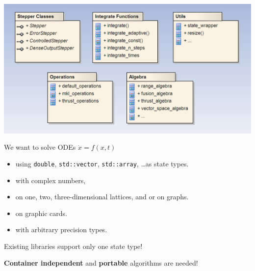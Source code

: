 \begin{frame}
 
 \vspace{2ex}
 \centerline{\includegraphics[draft=false,width=1.0\textwidth]{odeint_components.png}}

\end{frame}




\begin{frame}[fragile]

 \vspace{2ex}

 We want to solve ODEs $\dot{x}=f(x,t)$
 \begin{itemize}
  \item using  {\tt double}, {\tt std::vector}, {\tt std::array}, \dots as state types.
  \item with complex numbers,
  \item on one, two, three-dimensional lattices, and or on graphs.
  \item on graphic cards.
  \item with arbitrary precision types.
 \end{itemize}

 \vspace{2ex}

Existing libraries support only one state type!

\vspace{4ex}
\centerline{\textbf{Container independent} and {\bf portable} algorithms are needed!}

\end{frame}







